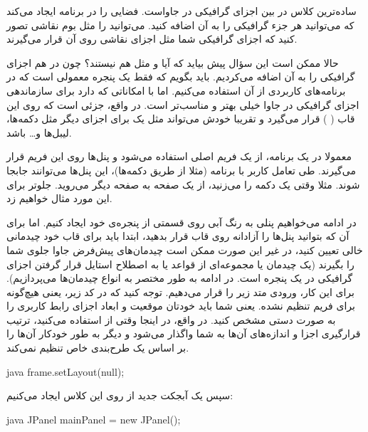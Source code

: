  ساده‌ترین کلاس در بین اجزای گرافیکی در جاواست.
 فضایی را در برنامه ایجاد می‌کند که می‌توانید هر جزء
گرافیکی را به آن اضافه کنید. می‌توانید  را مثل بوم
نقاشی تصور کنید که اجزای گرافیکی شما مثل اجزای نقاشی روی آن قرار
می‌گیرند.

حالا ممکن است این سؤال پیش بیاید که آیا  و
 مثل هم نیستند؟ چون در  هم اجزای
گرافیکی را به آن اضافه می‌کردیم. باید بگویم که  فقط
یک پنجره معمولی است که در برنامه‌های کاربردی از آن استفاده می‌کنیم. اما
 با امکاناتی که دارد برای سازماندهی اجزای گرافیکی در
جاوا خیلی بهتر و مناسب‌تر است. در واقع،  جزئی است که
روی این قاب (  ) قرار می‌گیرد و تقریبا خودش می‌تواند
مثل یک  برای اجزای دیگر مثل دکمه‌ها، لیبل‌ها و\ldots{}
باشد.

معمولا در یک برنامه، از یک فریم اصلی استفاده می‌شود و پنل‌ها روی این فریم
قرار می‌گیرند. طی تعامل کاربر با برنامه (مثلا از طریق دکمه‌ها)، این پنل‌ها
می‌توانند جابجا شوند. مثلا وقتی یک دکمه را می‌زنید، از یک صفحه به صفحه
دیگر می‌روید. جلوتر برای این مورد مثال خواهیم زد.

در ادامه می‌خواهیم پنلی به رنگ آبی روی قسمتی از پنجره‌ی خود ایجاد کنیم.
اما برای آن که بتوانید پنل‌ها را آزادانه روی قاب قرار بدهید، ابتدا باید
برای قاب خود چیدمانی خالی تعیین کنید، در غیر این صورت ممکن است چیدمان‌های
پیش‌فرض جاوا جلوی شما را بگیرند (یک چیدمان‌ یا 
مجموعه‌ای از قواعد یا به اصطلاح استایل قرار گرفتن اجزای گرافیکی در یک
پنجره است. در ادامه به طور مختصر به انواع چیدمان‌‌ها می‌پردازیم). برای این
کار، ورودی متد زیر را  قرار می‌دهیم. توجه کنید که در کد
زیر،  یعنی هیچ‌گونه  برای
فریم تنظیم نشده. یعنی شما باید خودتان موقعیت و ابعاد اجزای رابط کاربری
را به صورت دستی مشخص کنید. در واقع، در اینجا وقتی از 
استفاده می‌کنید، ترتیب قرارگیری اجزا و اندازه‌های آن‌ها به شما واگذار می‌شود
و دیگر  به طور خودکار آن‌ها را بر اساس یک طرح‌بندی خاص
تنظیم نمی‌کند.

\begin{codebox}{java}
frame.setLayout(null);
\end{codebox}

سپس یک آبجکت جدید از روی این کلاس  ایجاد می‌کنیم:

\begin{codebox}{java}
JPanel mainPanel = new JPanel();
\end{codebox}

